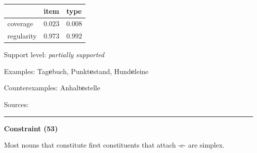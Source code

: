 \vspace{-0.25em}

\begin{table}[!ht]
\begin{center}
\setlength{\extrarowheight}{1pt}
\begin{tabularx}{\columnwidth}{|X|X|X|}
\hline
 & item & type \\
\hline
 coverage & $0.023$ & $0.008$ \\
\hline
 regularity & $0.973$ & $0.992$ \\
\hline
\end{tabularx}
\end{center}
\end{table}

\vspace{-1.35em}

\noindent
Support level: \textit{partially supported}

\vspace{0.3em}

\noindent
Examples: Tag\textbf{e}buch, Punkt\textbf{e}stand, Hund\textbf{e}leine

\noindent
Counterexamples: Anhalt\textbf{e}stelle

\vspace{0.3em}

\noindent
Sources: \citet[9, 18]{kuerschner_2010}

\vspace{0.35em}
\hrule




\vspace{0.4em}

\begin{center}
\textbf{Constraint (53)}
\end{center}

\noindent
Most nouns that constitute first constituents that attach -e- are simplex.
\vspace{0.5em}


